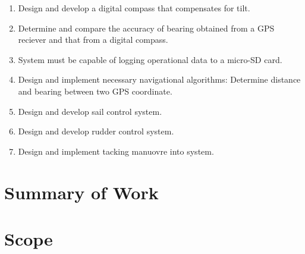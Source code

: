 \begin{enumerate}
  \item Design and develop a digital compass that compensates for tilt.
  \item Determine and compare the accuracy of bearing obtained from a GPS reciever and that from a digital compass.
  \item System must be capable of logging operational data to a micro-SD card.
  \item Design and implement necessary navigational algorithms: Determine distance and bearing between two GPS coordinate.
  \item Design and develop sail control system.
  \item Design and develop rudder control system.
  \item Design and implement tacking manuovre into system.
\end{enumerate}

\section{Summary of Work}

\section{Scope}







